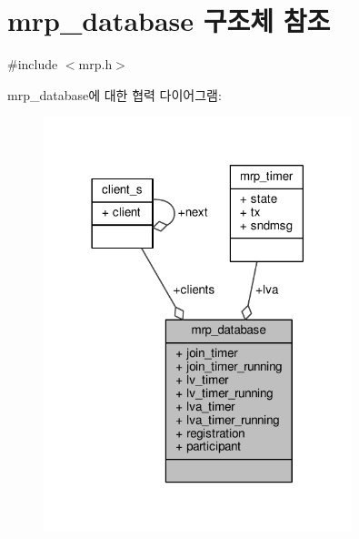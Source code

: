 \hypertarget{structmrp__database}{}\section{mrp\+\_\+database 구조체 참조}
\label{structmrp__database}


{\ttfamily \#include $<$mrp.\+h$>$}



mrp\+\_\+database에 대한 협력 다이어그램\+:
\nopagebreak
\begin{figure}[H]
\begin{center}
\leavevmode
\includegraphics[width=254pt]{structmrp__database__coll__graph}
\end{center}
\end{figure}
